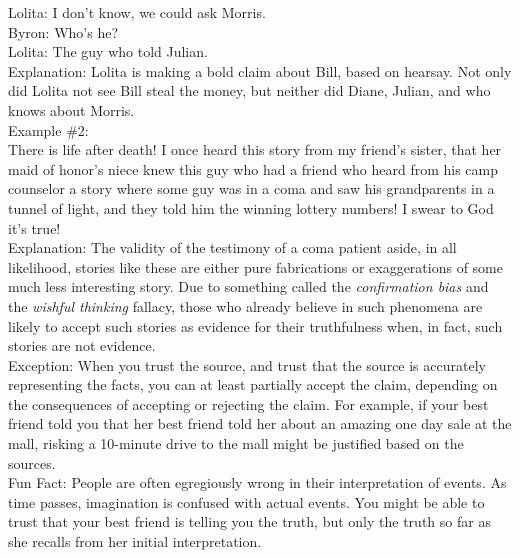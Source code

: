\documentclass[a4paper,12pt,single,pdftex]{scrbook}
\begin{document}
    
      Lolita:  I don’t know, we could ask Morris.
    \\

    
      Byron: Who’s he?
    \\

    
      Lolita: The guy who told Julian.
    \\

    
      Explanation: Lolita is making a bold claim about Bill, based on hearsay.  Not only did Lolita not see Bill steal the money, but neither did Diane, Julian, and who knows about Morris.
    \\

    
      Example \#2:
    \\

    
      There is life after death!  I once heard this story from my friend’s sister, that her maid of honor’s niece knew this guy who had a friend who heard from his camp counselor a story where some guy was in a coma and saw his grandparents in a tunnel of light, and they told him the winning lottery numbers!  I swear to God it’s true!
    \\

    
      Explanation: The validity of the testimony of a coma patient aside, in all likelihood, stories like these are either pure fabrications or exaggerations of some much less interesting story.  Due to something called the {\it confirmation bias} and the {\it wishful thinking}  fallacy, those who already believe in such phenomena are likely to accept such stories as evidence for their truthfulness when, in fact, such stories are not evidence.
    \\

    
      Exception: When you trust the source, and trust that the source is accurately representing the facts, you can at least partially accept the claim, depending on the consequences of accepting or rejecting the claim.  For example, if your best friend told you that her best friend told her about an amazing one day sale at the mall, risking a 10-minute drive to the mall might be justified based on the sources.
    \\

    
      Fun Fact: People are often egregiously wrong in their interpretation of events.  As time passes, imagination is confused with actual events.  You might be able to trust that your best friend is telling you the truth, but only the truth so far as she recalls from her initial interpretation.
    \\
\end{document}

